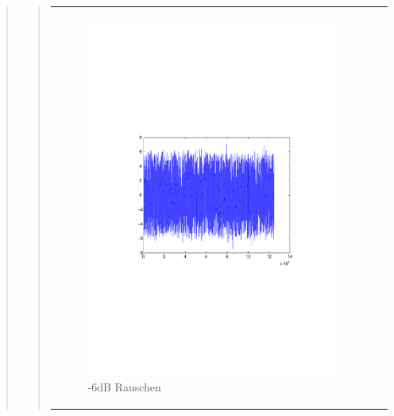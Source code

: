 \begin{quote}
\begin{quote}
\begin{center}
\begin{tabular}{ll}
               \hspace{-4.5cm}
                   \begin{minipage}{0.6\textwidth}
        
                       \begin{figure}[H]
                           \includegraphics[scale=0.6, trim = 35mm 85mm 40mm 95mm, clip]{./Bilder/Rauschen-6dB}
                           \caption{-6dB Rauschen}
                       \end{figure}
        
                   \end{minipage}
        

\end{tabular}
\end{center}
\end{quote}
\end{quote}
